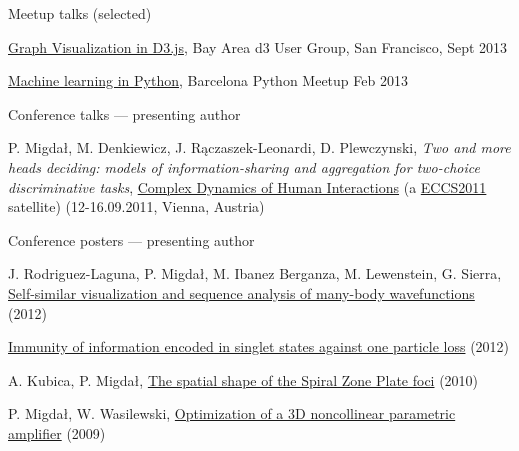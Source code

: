 \documentclass[margin,line]{resume}
\begin{document}
\begin{resume}
    Meetup talks (selected)
    \begin{list2}
        \item \href{http://www.meetup.com/Bay-Area-d3-User-Group/events/133292932/}{Graph Visualization in D3.js}, Bay Area d3 User Group, San Francisco, \hfill Sept 2013
        \item \href{http://nbviewer.ipython.org/gist/stared/4738143}{Machine learning in Python}, Barcelona Python Meetup \hfill Feb 2013
    \end{list2}

    Conference talks --- presenting author
     \begin{list2}
        \item P. Migdał, M. Denkiewicz, J. Rączaszek-Leonardi, D. Plewczynski, {\sl Two and more heads deciding: models of information-sharing and aggregation for two-choice discriminative tasks}, \href{http://markov.uc3m.es/complexdynamics11/Home.html}{Complex Dynamics of Human Interactions} (a \href{http://www.eccs2011.eu/}{ECCS2011} satellite) (12-16.09.2011, Vienna, Austria)
    \end{list2}   

    Conference posters --- presenting author
    \begin{list2}
        \item J. Rodriguez-Laguna, P. Migdał, M. Ibanez Berganza, M. Lewenstein, G. Sierra, \href{http://dx.doi.org/10.6084/m9.figshare.97233}{Self-similar visualization and sequence analysis of many-body wavefunctions} (2012)
        \item \href{http://dx.doi.org/10.6084/m9.figshare.97235}{Immunity of information encoded in singlet states against one particle loss} (2012)
        \item A. Kubica, P. Migdał, \href{http://dx.doi.org/10.6084/m9.figshare.97236}{The spatial shape of the Spiral Zone Plate foci} (2010)
        \item P. Migdał, W. Wasilewski, \href{http://dx.doi.org/10.6084/m9.figshare.97237}{Optimization of a 3D noncollinear parametric amplifier} (2009)
    \end{list2}
    

\end{resume}
\end{document}
